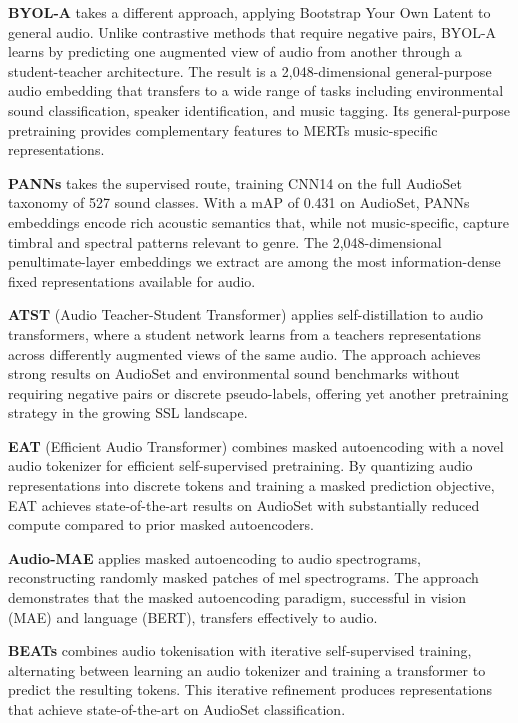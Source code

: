 \documentclass[conference]{IEEEtran}
\begin{document}
\textbf{BYOL-A} \citep{niizumi2023byola} takes a different approach,
applying Bootstrap Your Own Latent to general audio. Unlike contrastive
methods that require negative pairs, BYOL-A learns by predicting one
augmented view of audio from another through a student-teacher
architecture. The result is a 2,048-dimensional general-purpose audio
embedding that transfers to a wide range of tasks including
environmental sound classification, speaker identification, and music
tagging. Its general-purpose pretraining provides complementary features
to MERT\textquotesingle s music-specific representations.

\textbf{PANNs} \citep{kong2020panns} takes the supervised route,
training CNN14 on the full AudioSet \citep{gemmeke2017audioset} taxonomy
of 527 sound classes. With a mAP of 0.431 on AudioSet, PANNs embeddings
encode rich acoustic semantics that, while not music-specific, capture
timbral and spectral patterns relevant to genre. The 2,048-dimensional
penultimate-layer embeddings we extract are among the most
information-dense fixed representations available for audio.

\textbf{ATST} (Audio Teacher-Student Transformer) \citep{li2024atst}
applies self-distillation to audio transformers, where a student network
learns from a teacher\textquotesingle s representations across
differently augmented views of the same audio. The approach achieves
strong results on AudioSet and environmental sound benchmarks without
requiring negative pairs or discrete pseudo-labels, offering yet another
pretraining strategy in the growing SSL landscape.

\textbf{EAT} (Efficient Audio Transformer) \citep{chen2024eat} combines
masked autoencoding with a novel audio tokenizer for efficient
self-supervised pretraining. By quantizing audio representations into
discrete tokens and training a masked prediction objective, EAT achieves
state-of-the-art results on AudioSet with substantially reduced compute
compared to prior masked autoencoders.

\textbf{Audio-MAE} \citep{huang2022masked} applies masked autoencoding
to audio spectrograms, reconstructing randomly masked patches of mel
spectrograms. The approach demonstrates that the masked autoencoding
paradigm, successful in vision (MAE) and language (BERT), transfers
effectively to audio.

\textbf{BEATs} \citep{chen2023beats} combines audio tokenisation with
iterative self-supervised training, alternating between learning an
audio tokenizer and training a transformer to predict the resulting
tokens. This iterative refinement produces representations that achieve
state-of-the-art on AudioSet classification.
\end{document}
